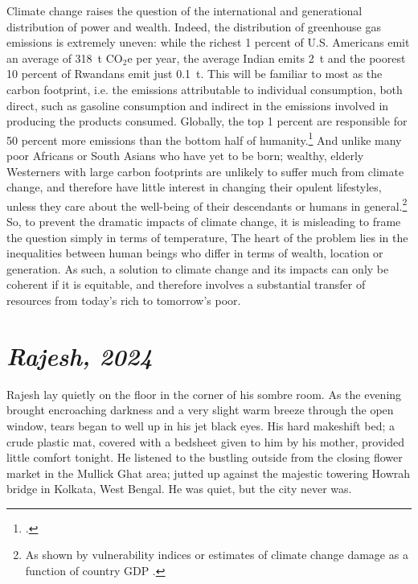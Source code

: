 \documentclass[a5paper,english,openany]{memoir}
\begin{document}
Climate change raises the question of the international and generational %
distribution of power and wealth. %
Indeed, the distribution of greenhouse gas emissions is extremely uneven: while the richest 1 percent of U.S. Americans emit an average of 318~t CO$_\text{2}$e per year, the average Indian emits 2~t and the poorest 10 percent of Rwandans emit just 0.1~t. %
This will be familiar to most as the carbon footprint, i.e. the emissions attributable to individual consumption, both direct, such as gasoline consumption and indirect in the emissions involved in producing the products consumed.
Globally, the top 1 percent are responsible for 50 percent more emissions than the bottom half of humanity.\footnote{\citet{bruckner_impacts_2022,chancel_carbon_2015}.} 
And unlike many poor Africans or South Asians who have yet to be born; %
wealthy, elderly Westerners with large carbon footprints are unlikely to suffer much from climate change, and therefore have little interest in changing their opulent lifestyles, unless they care about the well-being of their descendants or humans in general.\footnote{As shown by vulnerability indices \citep{chen_university_2015} or estimates of climate change damage as a function of country GDP \citep{burke_global_2015}.} 
So, to prevent the dramatic impacts of climate change, it is misleading to frame the question simply in terms of temperature, %
The heart %
of the problem lies in the inequalities between human beings who differ in terms of wealth, location or generation. As such, a solution to climate change and %
its impacts can only be coherent if it is equitable, and therefore involves a substantial transfer of resources from today's rich to tomorrow's poor. %
\chapter*{\textit{Rajesh, 2024}}\label{ch:narr_kolkata}Rajesh lay quietly on the floor in the corner of his sombre room. As the evening brought encroaching darkness and a very slight warm breeze through the open window, tears began to well up in his jet black eyes. His hard makeshift bed; a crude plastic mat, covered with a bedsheet given to him by his mother, provided little comfort tonight. He listened to the bustling outside from the closing flower market in the Mullick Ghat area; jutted up against the majestic towering Howrah bridge in Kolkata, West Bengal. He was quiet, but the city never was.
\end{document}
